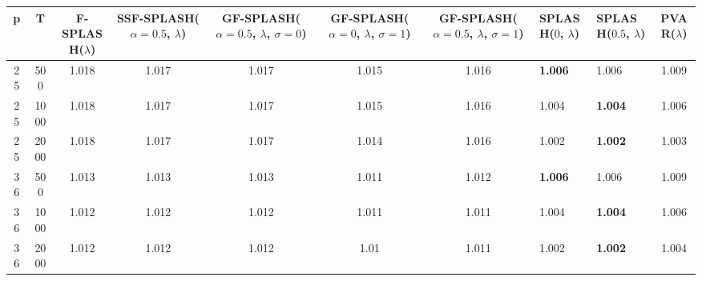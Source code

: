 \begin{tabular}{cccccccllc}
\hline
  p  &  T   &  F-SPLASH($\lambda$)  &  SSF-SPLASH($\alpha=0.5$, $\lambda$)  &  GF-SPLASH($\alpha=0.5$, $\lambda$, $\sigma=0$)  &  GF-SPLASH($\alpha=0$, $\lambda$, $\sigma=1$)  &  GF-SPLASH($\alpha=0.5$, $\lambda$, $\sigma=1$)  & SPLASH($0$, $\lambda$)   & SPLASH($0.5$, $\lambda$)   &  PVAR($\lambda$)  \\
\hline
 25  & 500  &         1.018         &                 1.017                 &                      1.017                       &                     1.015                      &                      1.016                       & \textbf{1.006}           & 1.006                      &       1.009       \\
 25  & 1000 &         1.018         &                 1.017                 &                      1.017                       &                     1.015                      &                      1.016                       & 1.004                    & \textbf{1.004}             &       1.006       \\
 25  & 2000 &         1.018         &                 1.017                 &                      1.017                       &                     1.014                      &                      1.016                       & 1.002                    & \textbf{1.002}             &       1.003       \\
 36  & 500  &         1.013         &                 1.013                 &                      1.013                       &                     1.011                      &                      1.012                       & \textbf{1.006}           & 1.006                      &       1.009       \\
 36  & 1000 &         1.012         &                 1.012                 &                      1.012                       &                     1.011                      &                      1.011                       & 1.004                    & \textbf{1.004}             &       1.006       \\
 36  & 2000 &         1.012         &                 1.012                 &                      1.012                       &                      1.01                      &                      1.011                       & 1.002                    & \textbf{1.002}             &       1.004       \\
\hline
\end{tabular}